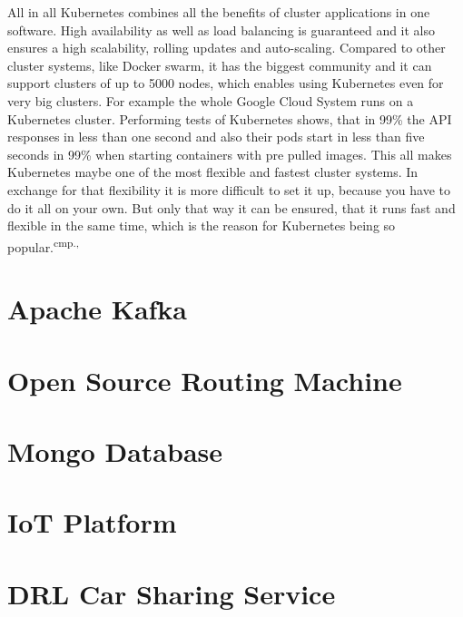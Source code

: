 All in all Kubernetes combines all the benefits of cluster applications in one software. High availability as well as load balancing is guaranteed and it also ensures a high scalability, rolling updates and auto-scaling. Compared to other cluster systems, like Docker swarm, it has the biggest community and it can support clusters of up to 5000 nodes, which enables using Kubernetes even for very big clusters. For example the whole Google Cloud System runs on a Kubernetes cluster. Performing tests of Kubernetes shows, that in 99\% the API responses in less than one second and also their pods start in less than five seconds in 99\% when starting containers with pre pulled images. This all makes Kubernetes maybe one of the most flexible and fastest cluster systems. In exchange for that flexibility it is more difficult to set it up, because you have to do it all on your own. But only that way it can be ensured, that it runs fast and flexible in the same time, which is the reason for Kubernetes being so popular.\textsuperscript{cmp.\cite{19}, \cite{20}}


\section{Apache Kafka}

\section{Open Source Routing Machine}

\section{Mongo Database}

\section{IoT Platform}

\section{DRL Car Sharing Service}

